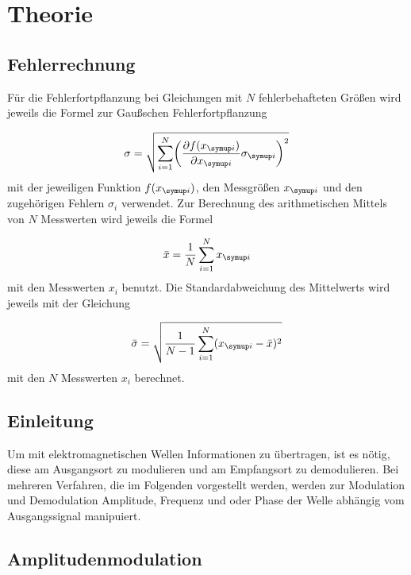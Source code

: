\section{Theorie}
\label{sec:Theorie}

\subsection{Fehlerrechnung}

Für die Fehlerfortpflanzung bei Gleichungen mit $N$ fehlerbehafteten Größen
wird jeweils die Formel zur Gaußschen Fehlerfortpflanzung

\begin{equation*}
  \sigma = \sqrt{\sum_{i=1}^{N}\biggl(\frac{\partial f(x_{\g{i}})}{\partial x_{\g{i}}}
  \sigma_{\g{i}}\biggr)^2}
\end{equation*}
mit der jeweiligen Funktion $f(x_{\g{i}})$, den Messgrößen $x_{\g{i}}$ und den
zugehörigen Fehlern $\sigma_i$ verwendet.
Zur Berechnung des arithmetischen Mittels von $N$ Messwerten wird jeweils die
Formel

\begin{equation*}
  \bar{x} = \frac{1}{N}\sum_{i=1}^{N}x_{\g{i}}
\end{equation*}
mit den Messwerten $x_i$ benutzt.
Die Standardabweichung des Mittelwerts wird jeweils mit der Gleichung

\begin{equation*}
  \bar{\sigma} = \sqrt{\frac{1}{N-1}\sum_{i=1}^{N}(x_{\g{i}} - \bar{x})^2}
\end{equation*}
mit den $N$ Messwerten $x_i$ berechnet.

\subsection{Einleitung}

Um mit elektromagnetischen Wellen Informationen zu übertragen, ist es nötig,
diese am Ausgangsort zu modulieren und am Empfangsort zu demodulieren. Bei mehreren Verfahren,
die im Folgenden vorgestellt werden, werden zur Modulation und Demodulation Amplitude, Frequenz und oder Phase der
Welle abhängig vom Ausgangssignal manipuiert.

\subsection{Amplitudenmodulation}

